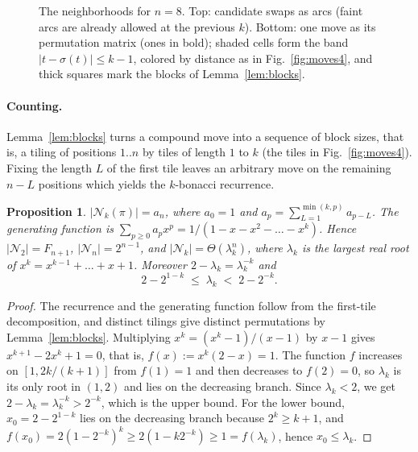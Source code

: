 \documentclass[letterpaper]{article} %
\newtheorem{proposition}{Proposition}
\theoremstyle{definition}
\newcommand{\N}{\mathcal{N}}
\begin{document}
\begin{figure}[t]
{%
}
\caption{The neighborhoods for $n=8$. Top: candidate swaps as arcs
(faint arcs are already allowed at the previous $k$). Bottom: one move
as its permutation matrix (ones in bold); shaded cells form the band
$|t-\sigma(t)|\leq k-1$, colored by distance as in Fig.~\ref{fig:moves4}, and thick squares mark the blocks of
Lemma~\ref{lem:blocks}.}
\label{fig:boards}
\end{figure}

\paragraph{Counting.} Lemma~\ref{lem:blocks} turns a compound move into
a sequence of block sizes, that is, a tiling of positions $1..n$ by tiles
of length $1$ to $k$ (the tiles in Fig.~\ref{fig:moves4}). Fixing the length $L$ of
the first tile leaves an arbitrary move on the remaining $n-L$ positions
which yields the $k$-bonacci recurrence.

\begin{proposition}\label{prop:count}
$|\N_k(\pi)|=a_n$, where $a_0=1$ and $a_p=\sum_{L=1}^{\min(k,p)}a_{p-L}$.
The generating function is $\sum_{p\geq 0}a_p x^p=1/(1-x-x^2-\dots-x^k)$.
Hence $|\N_2|=F_{n+1}$, $|\N_n|=2^{n-1}$, and
$|\N_k|=\Theta(\lambda_k^n)$, where $\lambda_k$ is the largest real root
of $x^k=x^{k-1}+\dots+x+1$. Moreover $2-\lambda_k=\lambda_k^{-k}$ and
\begin{equation}\label{eq:lambda}
2-2^{1-k}\;\leq\;\lambda_k\;<\;2-2^{-k}.
\end{equation}
\end{proposition}
\begin{proof}
The recurrence and the generating function follow from the first-tile
decomposition, and distinct tilings give distinct permutations by
Lemma~\ref{lem:blocks}. Multiplying
$x^k=(x^k-1)/(x-1)$ by $x-1$ gives $x^{k+1}-2x^k+1=0$, that is,
$f(x):=x^k(2-x)=1$. The function $f$ increases on $[1,2k/(k+1)]$ from
$f(1)=1$ and then decreases to $f(2)=0$, so $\lambda_k$ is its only root
in $(1,2)$ and lies on the decreasing branch. Since $\lambda_k<2$, we get
$2-\lambda_k=\lambda_k^{-k}>2^{-k}$, which is the upper bound. For the
lower bound, $x_0=2-2^{1-k}$ lies on the decreasing branch because
$2^k\geq k+1$, and $f(x_0)=2(1-2^{-k})^k\geq 2(1-k2^{-k})\geq 1=f(\lambda_k)$,
hence $x_0\leq\lambda_k$.
\end{proof}
\end{document}
